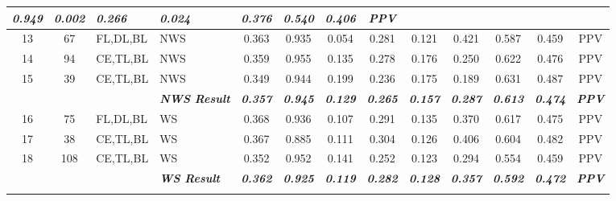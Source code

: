 \begin{table}[H]
{\begin{tabular}{ccl|l|c|c|c|c|c|c|c|c|c|}
    \textit{\textbf{0.949}} &
    \textit{\textbf{0.002}} &
    \textit{\textbf{0.266}} &
    \textit{\textbf{0.024}} &
    \textit{\textbf{0.376}} &
    \textit{\textbf{0.540}} &
    \textit{\textbf{0.406}} &
    \textit{\textbf{PPV}} \\ \hline
  \multicolumn{1}{|c|}{13} &
    \multicolumn{1}{c|}{67} &
    FL,DL,BL &
    NWS &
    0.363 &
    0.935 &
    0.054 &
    0.281 &
    0.121 &
    0.421 &
    0.587 &
    0.459 &
    PPV \\ \hline
  \multicolumn{1}{|c|}{14} &
    \multicolumn{1}{c|}{94} &
    CE,TL,BL &
    NWS &
    0.359 &
    0.955 &
    0.135 &
    0.278 &
    0.176 &
    0.250 &
    0.622 &
    0.476 &
    PPV \\ \hline
  \multicolumn{1}{|c|}{15} &
    \multicolumn{1}{c|}{39} &
    CE,TL,BL &
    NWS &
    0.349 &
    0.944 &
    0.199 &
    0.236 &
    0.175 &
    0.189 &
    0.631 &
    0.487 &
    PPV \\ \hline
  \textit{} &
    \textit{} &
    \textit{} &
    \textit{\textbf{NWS Result}} &
    \textit{\textbf{0.357}} &
    \textit{\textbf{0.945}} &
    \textit{\textbf{0.129}} &
    \textit{\textbf{0.265}} &
    \textit{\textbf{0.157}} &
    \textit{\textbf{0.287}} &
    \textit{\textbf{0.613}} &
    \textit{\textbf{0.474}} &
    \textit{\textbf{PPV}} \\ \hline
  \multicolumn{1}{|c|}{16} &
    \multicolumn{1}{c|}{75} &
    FL,DL,BL &
    WS &
    0.368 &
    0.936 &
    0.107 &
    0.291 &
    0.135 &
    0.370 &
    0.617 &
    0.475 &
    PPV \\ \hline
  \multicolumn{1}{|c|}{17} &
    \multicolumn{1}{c|}{38} &
    CE,TL,BL &
    WS &
    0.367 &
    0.885 &
    0.111 &
    0.304 &
    0.126 &
    0.406 &
    0.604 &
    0.482 &
    PPV \\ \hline
  \multicolumn{1}{|c|}{18} &
    \multicolumn{1}{c|}{108} &
    CE,TL,BL &
    WS &
    0.352 &
    0.952 &
    0.141 &
    0.252 &
    0.123 &
    0.294 &
    0.554 &
    0.459 &
    PPV \\ \hline
  \textit{} &
    \textit{} &
    \textit{} &
    \textit{\textbf{WS Result}} &
    \textit{\textbf{0.362}} &
    \textit{\textbf{0.925}} &
    \textit{\textbf{0.119}} &
    \textit{\textbf{0.282}} &
    \textit{\textbf{0.128}} &
    \textit{\textbf{0.357}} &
    \textit{\textbf{0.592}} &
    \textit{\textbf{0.472}} &
    \textit{\textbf{PPV}} \\ \cline{4-13} 
  \textit{} &
    \textit{} &
    \textit{} &
    \cellcolor[HTML]{000000}{\color[HTML]{FFFFFF} \textit{\textbf{Grand Average}}} &

\end{tabular}}
\end{table}
